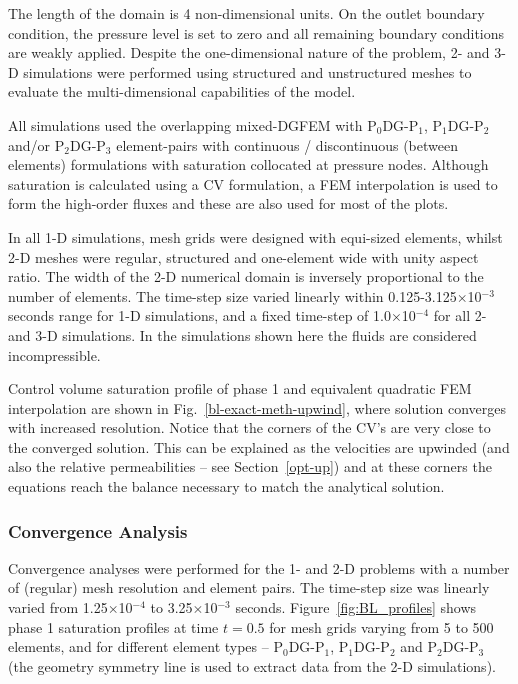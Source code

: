 \documentclass[preprint,authoryear,12pt]{elsarticle}
\newcommand{\PN}[2][error]{P$_{#1}$DG-P$_{#2}$}
\begin{document}
The length of the domain is 4 non-dimensional units. On the outlet boundary condition, the pressure level is set to zero and all remaining boundary conditions are weakly applied. Despite the one-dimensional nature of the problem, 2- and 3-D simulations were performed using structured and unstructured meshes to evaluate the multi-dimensional capabilities of the model.

All simulations used the overlapping mixed-DGFEM with \PN[0]{1}, \PN[1]{2} and/or \PN[2]{3} element-pairs with continuous /  discontinuous (between elements) formulations with saturation collocated at pressure nodes. Although saturation is calculated using  a CV formulation, a FEM interpolation is used to form the high-order fluxes and these are also used for most of the plots. 

In all 1-D simulations, mesh grids were designed with equi-sized elements, whilst 2-D meshes were regular, structured and one-element wide with unity aspect ratio. The width of the 2-D numerical domain is inversely proportional to the number of elements. The time-step size varied linearly within 0.125-3.125$\times$10$^{-3}$ seconds range for 1-D simulations, and a fixed time-step of 1.0$\times$10$^{-4}$ for all 2- and 3-D simulations. In the simulations shown here the fluids are considered incompressible.

\medskip
Control volume saturation profile of phase 1 and equivalent quadratic FEM interpolation are shown in Fig.~\ref{bl-exact-meth-upwind}, where solution converges with increased resolution. Notice that the corners of the CV's are very close to the converged solution. This can be explained as the velocities are upwinded (and also the relative permeabilities -- see Section~\ref{opt-up}) and at these corners the equations reach the balance necessary to match the analytical solution. 

\subsubsection{Convergence Analysis}
Convergence analyses were performed for the 1- and 2-D problems with a number of (regular) mesh resolution and element pairs. The time-step size was linearly varied from 1.25$\times$10$^{-4}$ to 3.25$\times$10$^{-3}$ seconds. Figure~\ref{fig:BL_profiles} shows phase 1 saturation profiles at time $t=0.5$ for mesh grids varying from 5 to 500 elements, and for different element types -- \PN[0]{1}, \PN[1]{2} and \PN[2]{3} (the geometry symmetry line is used to extract data from the 2-D simulations).  
\end{document}
